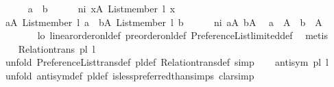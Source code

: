 \begin{isabellebody}
\ \ \ \ \isamarkupfalse%
\ a\ \ b\isanewline
\ \ \ \ \isamarkupfalse%
\ ni{\isacharcolon}{\kern0pt}\ {\isachardoublequoteopen}{\isasymforall}x{\isasymin}A{\isachardot}{\kern0pt}\ List{\isachardot}{\kern0pt}member\ l\ x{\isachardoublequoteclose}\isanewline
\ \ \ \ \isamarkupfalse%
\ aA{\isacharcolon}{\kern0pt}\ {\isachardoublequoteopen}List{\isachardot}{\kern0pt}member\ l\ a{\isachardoublequoteclose}\ \ bA{\isacharcolon}{\kern0pt}\ {\isachardoublequoteopen}List{\isachardot}{\kern0pt}member\ l\ b{\isachardoublequoteclose}\isanewline
\ \ \ \ \isamarkupfalse%
\ ni\ aA\ bA\ \isamarkupfalse%
\ {\isachardoublequoteopen}a\ {\isasymin}\ A\ {\isasymand}\ b\ {\isasymin}\ A{\isachardoublequoteclose}\isanewline
\ \ \ \ \ \ \isamarkupfalse%
\ lo\ linear{\isacharunderscore}{\kern0pt}order{\isacharunderscore}{\kern0pt}on{\isacharunderscore}{\kern0pt}l{\isacharunderscore}{\kern0pt}def\ preorder{\isacharunderscore}{\kern0pt}on{\isacharunderscore}{\kern0pt}l{\isacharunderscore}{\kern0pt}def\ Preference{\isacharunderscore}{\kern0pt}List{\isachardot}{\kern0pt}limited{\isacharunderscore}{\kern0pt}def\ \isamarkupfalse%
\ {\isacharparenleft}{\kern0pt}metis{\isacharparenright}{\kern0pt}\isanewline
\ \ \isamarkupfalse%
\isanewline
{}\isamarkupfalse%
\isanewline
\ \ \isamarkupfalse%
\ {\isachardoublequoteopen}Relation{\isachardot}{\kern0pt}trans\ {\isacharparenleft}{\kern0pt}pl{\isacharunderscore}{\kern0pt}{\isasymalpha}\ l{\isacharparenright}{\kern0pt}{\isachardoublequoteclose}\isanewline
\ \ \ \ \isamarkupfalse%
\ {\isacharparenleft}{\kern0pt}unfold\ Preference{\isacharunderscore}{\kern0pt}List{\isachardot}{\kern0pt}trans{\isacharunderscore}{\kern0pt}def\ pl{\isacharunderscore}{\kern0pt}{\isasymalpha}{\isacharunderscore}{\kern0pt}def\ Relation{\isachardot}{\kern0pt}trans{\isacharunderscore}{\kern0pt}def{\isacharcomma}{\kern0pt}\ simp{\isacharparenright}{\kern0pt}\isanewline
{}\isamarkupfalse%
\isanewline
\ \ \isamarkupfalse%
\ {\isachardoublequoteopen}antisym\ {\isacharparenleft}{\kern0pt}pl{\isacharunderscore}{\kern0pt}{\isasymalpha}\ l{\isacharparenright}{\kern0pt}{\isachardoublequoteclose}\isanewline
\ \ \isamarkupfalse%
\ {\isacharparenleft}{\kern0pt}unfold\ antisym{\isacharunderscore}{\kern0pt}def\ pl{\isacharunderscore}{\kern0pt}{\isasymalpha}{\isacharunderscore}{\kern0pt}def\ is{\isacharunderscore}{\kern0pt}less{\isacharunderscore}{\kern0pt}preferred{\isacharunderscore}{\kern0pt}than{\isachardot}{\kern0pt}simps{\isacharcomma}{\kern0pt}\ clarsimp{\isacharparenright}{\kern0pt}\isanewline

\end{isabellebody}
